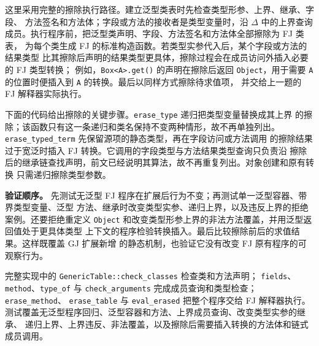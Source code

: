 \begin{taplsolutionentrybox}
这里采用完整的擦除执行路径。建立泛型类表时先检查类型形参、上界、继承、字段、
方法签名和方法体；字段或方法的接收者是类型变量时，沿 \(\Delta\) 中的上界查询
成员。执行程序前，把泛型类声明、字段、方法签名和方法体全部擦除为 FJ 类表，
为每个类生成 FJ 的标准构造函数。若类型实参代入后，某个字段或方法的结果类型
比其擦除后声明的结果类型更具体，擦除过程会在成员访问外插入必要的 FJ 类型转换；
例如，\texttt{Box<A>.get()} 的声明在擦除后返回 \texttt{Object}，用于需要
\texttt{A} 的位置时便插入到 \texttt{A} 的转换。最后以同样方式擦除待求值项，
并交给上一题的 FJ 解释器实际执行。

下面的代码给出擦除的关键步骤。\texttt{erase\_type} 递归把类型变量替换成其上界
的擦除；该函数只有这一条递归和类名保持不变两种情形，故不再单独列出。
\texttt{erase\_typed\_term} 先保留源项的静态类型，再在字段访问或方法调用
的擦除结果过于宽泛时插入 FJ 转换。它调用的字段类型与方法结果类型查询只负责沿
擦除后的继承链查找声明，前文已经说明其算法，故不再重复列出。对象创建和原有转换
只需递归擦除类型参数。


\textbf{验证顺序。}
先测试无泛型 FJ 程序在扩展后行为不变；再测试单一泛型容器、带界类型变量、泛型
方法、继承时改变类型实参、递归上界，以及违反上界的拒绝案例。还要拒绝重定义
\texttt{Object} 和改变类型形参上界的非法方法覆盖，并用泛型返回值处于更具体类型
上下文的程序检验转换插入。最后比较擦除前后的求值结果。这样既覆盖 GJ 扩展新增
的静态机制，也验证它没有改变 FJ 原有程序的可观察行为。

完整实现中的 \texttt{GenericTable::check\_classes} 检查类和方法声明；
\texttt{fields}、\texttt{method}、\texttt{type\_of} 与
\texttt{check\_arguments} 完成成员查询和类型检查；\texttt{erase\_method}、
\texttt{erase\_table} 与 \texttt{eval\_erased} 把整个程序交给 FJ 解释器执行。
测试覆盖无泛型程序回归、泛型容器和方法、上界成员查询、改变类型实参的继承、
递归上界、上界违反、非法覆盖，以及擦除后需要插入转换的方法体和链式成员调用。

\end{taplsolutionentrybox}
